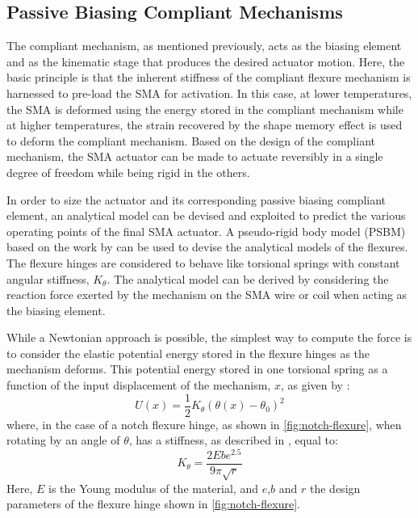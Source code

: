 \subsection{Passive Biasing Compliant Mechanisms}\label{subsec:passive-biasing-compliant-mech}
The compliant mechanism, as mentioned previously, acts as the biasing element and as the kinematic stage that produces the desired actuator motion. Here, the basic principle is that the inherent stiffness of the compliant flexure mechanism is harnessed to pre-load the SMA for activation. In this case, at lower temperatures, the SMA is deformed using the energy stored in the compliant mechanism while at higher temperatures, the strain recovered by the shape memory effect is used to deform the compliant mechanism. Based on the design of the compliant mechanism, the SMA actuator can be made to actuate reversibly in a single degree of freedom while being rigid in the others.

In order to size the actuator and its corresponding passive biasing compliant element, an analytical model can be devised and exploited to predict the various operating points of the final SMA actuator. A pseudo-rigid body model (PSBM) based on the work by \cite{heneinConceptionStructuresArticulees2005} can be used to devise the analytical models of the flexures. The flexure hinges are considered to behave like torsional springs with constant angular stiffness, $K_\theta$. The analytical model can be derived by considering the reaction force exerted by the mechanism on the SMA wire or coil when acting as the biasing element.

While a Newtonian approach is possible, the simplest way to compute the force is to consider the elastic potential energy stored in the flexure hinges as the mechanism deforms. This potential energy stored in one torsional spring as a function of the input displacement of the mechanism, $x$, as given by :
\begin{equation}\label{eq:flexure-pot-energy}
        U(x) = \frac{1}{2}K_{\theta} \left(\theta(x)-\theta_0 \right)^2
\end{equation}
where, in the case of a notch flexure hinge, as shown in \cref{fig:notch-flexure}, when rotating by an angle of $\theta$, has a stiffness, as described in \cite{heneinConceptionStructuresArticulees2005}, equal to:
\begin{equation}\label{eq:flexure-hinge-stiffness}
        K_{\theta} = \frac{2Ebe^{2.5}}{9\pi \sqrt{r}}
\end{equation}
Here, $E$ is the Young modulus of the material, and $e$,$b$ and $r$ the design parameters of the flexure hinge shown in \cref{fig:notch-flexure}.

